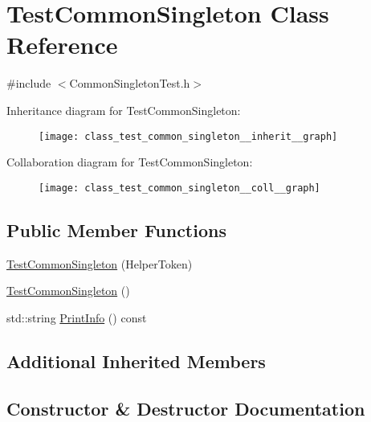 \hypertarget{class_test_common_singleton}{}\section{Test\+Common\+Singleton Class Reference}
\label{class_test_common_singleton}


{\ttfamily \#include $<$Common\+Singleton\+Test.\+h$>$}



Inheritance diagram for Test\+Common\+Singleton\+:\nopagebreak
\begin{figure}[H]
\begin{center}
\leavevmode
\texttt{[image: class\_test\_common\_singleton\_\_inherit\_\_graph]}
\end{center}
\end{figure}


Collaboration diagram for Test\+Common\+Singleton\+:\nopagebreak
\begin{figure}[H]
\begin{center}
\leavevmode
\texttt{[image: class\_test\_common\_singleton\_\_coll\_\_graph]}
\end{center}
\end{figure}
\subsection*{Public Member Functions}
\begin{DoxyCompactItemize}
\item 
\mbox{\hyperlink{class_test_common_singleton_a4ebb70c9574cbb589c9a51fcfa9e92e5}{Test\+Common\+Singleton}} (Helper\+Token)
\item 
\mbox{\hyperlink{class_test_common_singleton_ab54124ee482b7b31641fa1058e44b694}{Test\+Common\+Singleton}} ()
\item 
std\+::string \mbox{\hyperlink{class_test_common_singleton_a73ae91b8a0a23ae80e43c5effe13448c}{Print\+Info}} () const
\end{DoxyCompactItemize}
\subsection*{Additional Inherited Members}


\subsection{Constructor \& Destructor Documentation}
\mbox{\label{class_test_common_singleton_a4ebb70c9574cbb589c9a51fcfa9e92e5}} 
